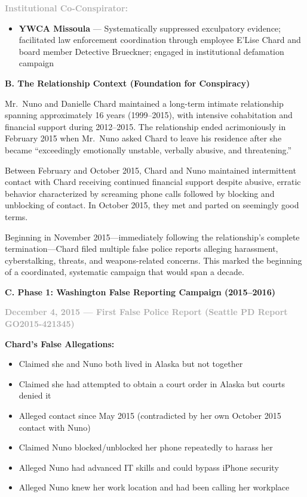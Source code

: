 \documentclass[11pt, letterpaper]{article}
\newcommand{\subsectiontitle}[1]{\vspace{0.15in}\noindent\textcolor{NavyBlue}{\textbf{#1}}\vspace{0.05in}}
\newcommand{\subsubsectiontitle}[1]{\vspace{0.1in}\noindent\textcolor{DarkGray}{\textbf{#1}}\vspace{0.05in}}
\begin{document}
\subsubsectiontitle{Institutional Co-Conspirator:}
\begin{itemize}[leftmargin=*]
    \item \textbf{YWCA Missoula} --- Systematically suppressed exculpatory evidence; facilitated law enforcement coordination through employee E'Lise Chard and board member Detective Brueckner; engaged in institutional defamation campaign
\end{itemize}

\subsectiontitle{B. The Relationship Context (Foundation for Conspiracy)}

Mr.\ Nuno and Danielle Chard maintained a long-term intimate relationship spanning approximately 16 years (1999--2015), with intensive cohabitation and financial support during 2012--2015. The relationship ended acrimoniously in February 2015 when Mr.\ Nuno asked Chard to leave his residence after she became ``exceedingly emotionally unstable, verbally abusive, and threatening.''

Between February and October 2015, Chard and Nuno maintained intermittent contact with Chard receiving continued financial support despite abusive, erratic behavior characterized by screaming phone calls followed by blocking and unblocking of contact. In October 2015, they met and parted on seemingly good terms.

Beginning in November 2015---immediately following the relationship's complete termination---Chard filed multiple false police reports alleging harassment, cyberstalking, threats, and weapons-related concerns. This marked the beginning of a coordinated, systematic campaign that would span a decade.

\subsectiontitle{C. Phase 1: Washington False Reporting Campaign (2015--2016)}

\subsubsectiontitle{December 4, 2015 --- First False Police Report (Seattle PD Report GO2015-421345)}

\textbf{Chard's False Allegations:}
\begin{itemize}[leftmargin=*,itemsep=2pt]
    \item Claimed she and Nuno both lived in Alaska but not together
    \item Claimed she had attempted to obtain a court order in Alaska but courts denied it
    \item Alleged contact since May 2015 (contradicted by her own October 2015 contact with Nuno)
    \item Claimed Nuno blocked/unblocked her phone repeatedly to harass her
    \item Alleged Nuno had advanced IT skills and could bypass iPhone security
    \item Alleged Nuno knew her work location and had been calling her workplace
\end{itemize}
\end{document}
